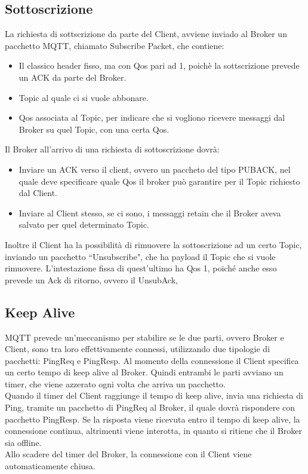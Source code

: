 \documentclass{article}
\begin{document}
\subsection{Sottoscrizione}
La richiesta di sottscrizione da parte del Client, avviene inviado al Broker un pacchetto MQTT, chiamato Subscribe Packet, che contiene:
\begin{itemize}
	\item Il classico header fisso, ma con Qos pari ad 1, poichè la sottscrizione prevede un ACK da parte del Broker.
	\item Topic al quale ci si vuole abbonare.
	\item Qos associata al Topic, per indicare che si vogliono ricevere messaggi dal Broker su quel Topic, con una certa Qos.
\end{itemize}
Il Broker all'arrivo di una richiesta di sottoscrizione dovrà:
\begin{itemize}
	\item Inviare un ACK verso il client, ovvero un paccheto del tipo PUBACK, nel quale deve specificare quale Qos il broker può garantire per il Topic richiesto dal Client.
	\item Inviare al Client stesso, se ci sono, i messaggi retain che il Broker aveva salvato per quel determinato Topic.
\end{itemize}
Inoltre il Client ha la possibilità di rimuovere la sottoscrizione ad un certo Topic, inviando un pacchetto ``Unsubscribe", che ha payload il Topic che si vuole rimuovere. L'intestazione fissa di quest'ultimo ha Qos 1, poiché anche esso prevede un Ack di ritorno, ovvero il UnsubAck,

\subsection{Keep Alive}
MQTT prevede un'meccanismo per stabilire se le due parti, ovvero Broker e Client, sono tra loro effettivamente connessi, utilizzando due tipologie di pacchetti: PingReq e PingResp. Al momento della connessione il Client specifica un certo tempo di keep alive al Broker. Quindi entrambi le parti avviano un timer, che viene azzerato ogni volta che arriva un pacchetto.\\
Quando il timer del Client raggiunge il tempo di keep alive, invia una richiesta di Ping, tramite un pacchetto di PingReq al Broker, il quale dovrà rispondere con pacchetto PingResp. Se la risposta viene ricevuta entro il tempo di keep alive, la connessione continua, altrimenti viene interotta, in quanto si ritiene che il Broker sia offline.\\
Allo scadere del timer del Broker, la connessione con il Client viene automaticamente chiusa.\\
\end{document}
